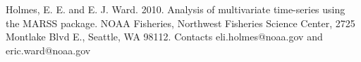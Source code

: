 

\thispagestyle{empty}
\vspace*{15cm}
\vfil
\begin{flushleft}

Holmes, E. E. and E. J. Ward. 2010. Analysis of multivariate time-series using the MARSS package. NOAA Fisheries, Northwest Fisheries Science Center, 2725 Montlake Blvd E., Seattle, WA 98112.  Contacts eli.holmes@noaa.gov and eric.ward@noaa.gov

\end{flushleft}



